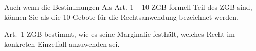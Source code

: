 Auch wenn die Bestimmungen Als Art. 1 -- 10 ZGB formell Teil des ZGB
sind, können Sie als die 10 Gebote für die Rechtsanwendung bezeichnet
werden. 

Art.\ 1 ZGB bestimmt, wie es seine Marginalie festhält, welches Recht im
konkreten Einzelfall anzuwenden sei.
